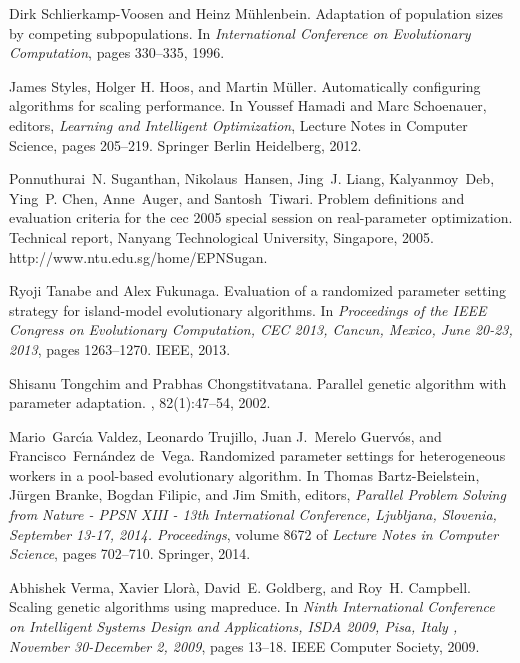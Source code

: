 \documentclass[final,1p,times]{elsarticle}
\begin{document}
\begin{thebibliography}{10}
Dirk Schlierkamp{-}Voosen and Heinz M{\"{u}}hlenbein.
\newblock Adaptation of population sizes by competing subpopulations.
\newblock In {\em International Conference on Evolutionary Computation}, pages
  330--335, 1996.

James Styles, Holger H. Hoos, and Martin M{\"{u}}ller.
\newblock Automatically configuring algorithms for scaling performance.
\newblock In Youssef Hamadi and Marc Schoenauer, editors, {\em Learning and
  Intelligent Optimization}, Lecture Notes in Computer Science, pages 205--219.
  Springer Berlin Heidelberg, 2012.

Ponnuthurai~N. Suganthan, Nikolaus~Hansen, Jing~J. Liang, Kalyanmoy~Deb, Ying~P. Chen, Anne~Auger, and
  Santosh~Tiwari.
\newblock Problem definitions and evaluation criteria for the cec 2005 special
  session on real-parameter optimization.
\newblock Technical report, Nanyang Technological University, Singapore, 2005.
\newblock http://www.ntu.edu.sg/home/EPNSugan.

Ryoji Tanabe and Alex Fukunaga.
\newblock Evaluation of a randomized parameter setting strategy for
  island-model evolutionary algorithms.
\newblock In {\em Proceedings of the {IEEE} Congress on Evolutionary
  Computation, {CEC} 2013, Cancun, Mexico, June 20-23, 2013}, pages 1263--1270.
  {IEEE}, 2013.

Shisanu Tongchim and Prabhas Chongstitvatana.
\newblock Parallel genetic algorithm with parameter adaptation.
, 82(1):47--54, 2002.

Mario~Garc{\'{\i}}a Valdez, Leonardo Trujillo, Juan J.~Merelo
  Guerv{\'{o}}s, and Francisco~Fern{\'{a}}ndez de~Vega.
\newblock Randomized parameter settings for heterogeneous workers in a
  pool-based evolutionary algorithm.
\newblock In Thomas Bartz{-}Beielstein, J{\"{u}}rgen Branke, Bogdan Filipic,
  and Jim Smith, editors, {\em Parallel Problem Solving from Nature - {PPSN}
  {XIII} - 13th International Conference, Ljubljana, Slovenia, September 13-17,
  2014. Proceedings}, volume 8672 of {\em Lecture Notes in Computer Science},
  pages 702--710. Springer, 2014.

Abhishek Verma, Xavier Llor{\`{a}}, David~E. Goldberg, and Roy~H. Campbell.
\newblock Scaling genetic algorithms using mapreduce.
\newblock In {\em Ninth International Conference on Intelligent Systems Design
  and Applications, {ISDA} 2009, Pisa, Italy , November 30-December 2, 2009},
  pages 13--18. {IEEE} Computer Society, 2009.


\end{thebibliography}
\end{document}
